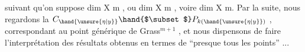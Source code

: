 
suivant qu'on suppose  dim X \hand{$\geqslant$} m , ou  dim X \hand{$\leqslant$} m , voire dim X \hand{$<$} m.
Par la suite, nous regardons la $C_{\hand{\unsure{\eta|y}}}\hand{$\subset$} P_{k(\hand{\unsure{\eta|y}})}$ , correspondant au point
générique  de  Grass$^{m+1}$ , et nous dispensons  de faire l'interprétation
des résultats obtenus en termes de  ``presque tous les points'' ...

